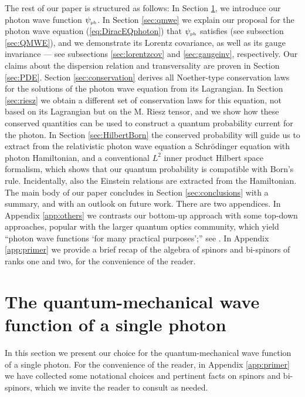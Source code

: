 \documentclass[12pt]{article}
\theoremstyle{definition}
\newcommand{\refeq}[1]{(\ref{#1})}
\numberwithin{equation}{section}
\newcommand{\psiPH}{{\psi_{\mbox{\rm\tiny ph}}}}
\begin{document}
 The rest of our paper is structured as follows:
 In Section \ref{sec:PSIphoton}, we introduce our photon wave function $\psiPH$.
 In Section \ref{sec:qmwe} we explain our proposal for the photon wave equation \refeq{eq:DiracEQphoton} 
that $\psiPH$ satisfies (see subsection \ref{sec:QMWE}), and we demonstrate its Lorentz covariance, as well as its gauge invariance ---
see subsections \ref{sec:lorentzcov} and \ref{sec:gaugeinv}, respectively. 
  Our claims about the dispersion relation and transversality are proven in Section \ref{sec:PDE}.  
 Section \ref{sec:conservation} derives all Noether-type conservation laws for the solutions of the photon wave equation from 
its Lagrangian.
  In Section \ref{sec:riesz} we obtain a different set of conservation laws for this equation, not based on its Lagrangian but
on the M. Riesz tensor, and we show how these conserved quantities can be used to construct a quantum probability current for the 
photon.
 In Section \ref{sec:HilbertBorn} the conserved probability will guide us to extract from the relativistic 
photon wave equation a Schr\"odinger equation with photon Hamiltonian, and a conventional $L^2$ inner product Hilbert space formalism,
which shows that our quantum probability is  compatible with Born's rule.  
 Incidentally, also the Einstein relations are extracted from the Hamiltonian.
 The main body of our paper concludes in Section \ref{sec:conclusions} with a summary, and with an outlook on future work.
 There are two appendices. 
 In Appendix \ref{app:others} we contrasts our bottom-up approach with some top-down approaches, popular with the larger 
quantum optics community, which yield ``photon wave functions `for many practical purposes';'' 
see \cite{IBBphotonREV, ScullyBOOK, SmithRaymer, Chandrasekar, Hawton, Mostafazadeh}.
 In Appendix \ref{app:primer} we provide a brief recap of the algebra of spinors and bi-spinors of ranks one and two, 
 for the convenience of the reader. 

\section{The quantum-mechanical wave function of a single photon}\label{sec:PSIphoton}
 In this section we present our choice for the quantum-mechanical wave function of a single photon. 
 For the convenience of the reader, in Appendix \ref{app:primer} we have collected some notational 
choices and pertinent facts on spinors and bi-spinors, which we invite the reader to consult as needed.
\end{document}
